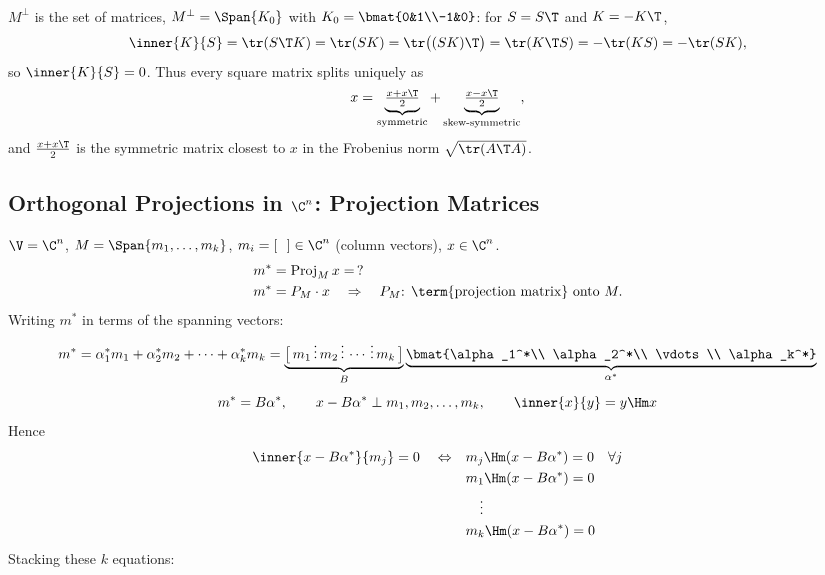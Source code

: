 \begin{example}
\begin{align*}
\end{align*}
\begin{insight}
$M^\perp$ is the set of  matrices, $M^\perp = \Span\{K_0\}$ with $K_0 = \bmat{0&1\\-1&0}$:
for $S=S\T$ and $K=-K\T$,
\[
\inner{K}{S} = \tr(S\T K) = \tr(SK) = \tr\big((SK)\T\big) = \tr(K\T S) = -\tr(KS) = -\tr(SK),
\]
so $\inner{K}{S}=0$. Thus every square matrix splits uniquely as
\[
x = \underbrace{\tfrac{x+x\T}{2}}_{\text{symmetric}} + \underbrace{\tfrac{x-x\T}{2}}_{\text{skew-symmetric}},
\]
and $\tfrac{x+x\T}{2}$ is the symmetric matrix closest to $x$ in the Frobenius norm $\sqrt{\tr(A\T A)}$.
\end{insight}
\end{example}

\subsection{Orthogonal Projections in $\C^n$: Projection Matrices}\label{ss:proj-matrices}
$\V=\C^n$, \quad $M = \Span\{m_1,\dots,m_k\}$, \quad $m_i = [\ \ ] \in\C^n$ (column vectors), \quad $x\in\C^n$.
\begin{align*}
m^* &= \operatorname{Proj}_M x = \,?\\
m^* &= P_M\cdot x \quad\Rightarrow\quad P_M\text{: \term{projection matrix} onto } M.
\end{align*}
Writing $m^*$ in terms of the spanning vectors:
\begin{gather*}
m^* = \alpha_1^* m_1 + \alpha_2^* m_2 + \dots + \alpha_k^* m_k
= \underbrace{\big[\, m_1 \,\vdots\, m_2 \,\vdots\, \cdots \,\vdots\, m_k\,\big]}_{B}
\underbrace{\bmat{\alpha_1^*\\ \alpha_2^*\\ \vdots\\ \alpha_k^*}}_{\alpha^*}\\[4pt]
m^* = B\alpha^*, \qquad x-B\alpha^* \perp m_1, m_2, \dots, m_k, \qquad \inner{x}{y} = y\Hm x
\end{gather*}
Hence
\begin{align*}
\inner{x-B\alpha^*}{m_j} = 0 \quad\Leftrightarrow\quad & m_j\Hm(x-B\alpha^*) = 0 \quad\forall j\\
& m_1\Hm(x-B\alpha^*) = 0\\
& \quad\vdots\\
& m_k\Hm(x-B\alpha^*) = 0
\end{align*}
Stacking these $k$ equations:
